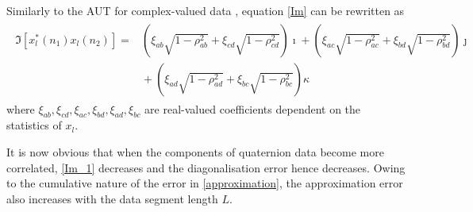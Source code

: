 \documentclass[review]{elsarticle}
\theoremstyle{plain}
\theoremstyle{remark}
\theoremstyle{plain}
\theoremstyle{definition}
\theoremstyle{prop}
\theoremstyle{definition}
\theoremstyle{plain}
\theoremstyle{plain}
\begin{document}
Similarly to the AUT for complex-valued data \cite{CheongTook2012}, equation \eqref{Im} can be rewritten as 
\begin{align}\label{Im_1}
\!\!\!\!\begin{array}{rl}
\mathfrak{I}\!\left[x_l^{*}\left(n_1\right)x_l\left(n_2\right)\right]\!=\!&\!\!\!\!\left(\!\xi_{ab}\sqrt{1-\rho_{ab}^{2}}+\xi_{cd}\sqrt{1-\rho_{cd}^{2}}\!\right)\!\!\imath\!+\!\left(\!\xi_{ac}\sqrt{1-\rho_{ac}^{2}}+\xi_{bd}\sqrt{1-\rho_{bd}^{2}}\!\right)\!\!\jmath\!\\&\!\!\!\!+\left(\xi_{ad}\sqrt{1-\rho_{ad}^{2}}+\xi_{bc}\sqrt{1-\rho_{bc}^{2}}\right)\kappa
\end{array}
\end{align}
where $\xi_{ab},\xi_{cd},\xi_{ac},\xi_{bd},\xi_{ad},\xi_{bc}$ are real-valued coefficients dependent on the statistics of $x_l$. 

It is now obvious that when the components of quaternion data become more correlated, \eqref{Im_1} decreases and the diagonalisation error hence decreases.
Owing to the cumulative nature of the error in \eqref{approximation}, the approximation error also
increases with the data segment length $L$.
\end{document}
